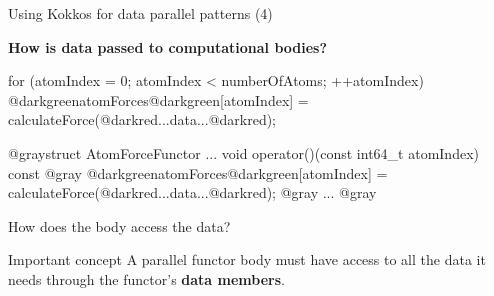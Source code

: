 
\iffull
\begin{frame}[fragile]{Using Kokkos for data parallel patterns (4)}

  \textbf{How is data passed to computational bodies?}

  \vspace{2pt}

  \begin{code}
for (atomIndex = 0; atomIndex < numberOfAtoms; ++atomIndex) {
  @darkgreenatomForces@darkgreen[atomIndex] = calculateForce(@darkred...data...@darkred);
}
  \end{code}

  \vspace{-3pt}

  \begin{code}[keywords={}, frame=single]
@graystruct AtomForceFunctor {
  ...
  void operator()(const int64_t atomIndex) const {@gray
    @darkgreenatomForces@darkgreen[atomIndex] = calculateForce(@darkred...data...@darkred);
  @gray}
  ...
}@gray
  \end{code}
  \pause
  \vspace{5pt}

  How does the body access the data?

  \vspace{-3pt}

  \begin{block}{Important concept}
    A parallel functor body must have access to all the data it needs through the functor's \textbf{data members}.
  \end{block}

\end{frame}
\fi


